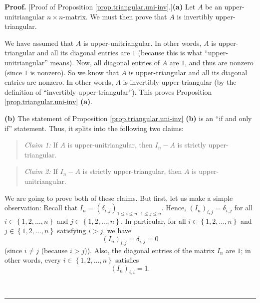 \documentclass[numbers=enddot,12pt,final,onecolumn,notitlepage]{scrartcl}%
\theoremstyle{definition}
\newenvironment{statement}{\begin{quote}}{\end{quote}}
\newenvironment{proof}[1][Proof]{\noindent\textbf{#1.} }{\ \rule{0.5em}{0.5em}}
\begin{document}
\begin{proof}
[Proof of Proposition \ref{prop.triangular.uni-inv}.]\textbf{(a)} Let $A$ be
an upper-unitriangular $n \times n$-matrix. We must then prove that $A$ is
invertibly upper-triangular.

We have assumed that $A$ is upper-unitriangular. In other words, $A$ is
upper-triangular and all its diagonal entries are $1$ (because this is what
``upper-unitriangular'' means). Now, all diagonal entries of $A$ are $1$, and
thus are nonzero (since $1$ is nonzero). So we know that $A$ is
upper-triangular and all its diagonal entries are nonzero. In other words, $A$
is invertibly upper-triangular (by the definition of ``invertibly
upper-triangular''). This proves Proposition \ref{prop.triangular.uni-inv}
\textbf{(a)}.

\textbf{(b)} The statement of Proposition \ref{prop.triangular.uni-inv}
\textbf{(b)} is an ``if and only if'' statement. Thus, it splits into the
following two claims:

\begin{statement}
\textit{Claim 1:} If $A$ is upper-unitriangular, then $I_{n} - A$ is strictly upper-triangular.
\end{statement}

\begin{statement}
\textit{Claim 2:} If $I_{n} - A$ is strictly upper-triangular, then $A$ is upper-unitriangular.
\end{statement}

We are going to prove both of these claims. But first, let us make a simple
observation: Recall that $I_{n} = \left(  \delta_{i,j}\right)  _{1\leq i\leq
n, \ 1\leq j\leq n}$. Hence, $\left(  I_{n}\right)  _{i, j} = \delta_{i, j}$
for all $i \in\left\{  1,2,\ldots,n\right\}  $ and $j \in\left\{
1,2,\ldots,n\right\}  $. In particular, for all $i \in\left\{  1,2,\ldots
,n\right\}  $ and $j \in\left\{  1,2,\ldots,n\right\}  $ satisfying $i > j$,
we have
\begin{equation}
\left(  I_{n}\right)  _{i, j} = \delta_{i, j} = 0
\label{pf.prop.triangular.uni-inv.b.1}%
\end{equation}
(since $i \neq j$ (because $i > j$)). Also, the diagonal entries of the matrix
$I_{n}$ are $1$; in other words, every $i \in\left\{  1,2,\ldots,n\right\}  $
satisfies
\begin{equation}
\left(  I_{n}\right)  _{i, i} = 1. \label{pf.prop.triangular.uni-inv.b.2}%
\end{equation}



\end{proof}
\end{document}
